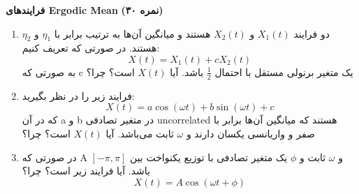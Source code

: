 \Large \textbf{فرایندهای Ergodic Mean}
\large \textbf{(۳۰ نمره)}

\normalsize \vspace{0.5cm}

\begin{enumerate}[label=(\alph*)]
	\item
	دو فرایند
	${X_1}\left( t \right)$
	و
	${X_2}\left( t \right)$
	هستند و میانگین آن‌ها به ترتیب برابر با
	${\eta _1}$
	و
	${\eta _2}$
	هستند. در صورتی که تعریف کنیم:
	$$
	X\left( t \right) = {X_1}\left( t \right) + c{X_2}\left( t \right)
	$$
	به صورتی که c یک متغیر برنولی مستقل با احتمال
	$\frac{1}{2}$
	باشد. آیا
	$X\left( t \right)$
	است؟ چرا؟
	\item 
	فرایند زیر را در نظر بگیرید:
	$$
	X\left( t \right) = a\cos \left( {\omega t} \right) + b\sin \left( {\omega t} \right) + c
	$$
	که در آن a و b در متغیر تصادفی uncorrelated هستند که میانگین آن‌ها برابر با صفر و واریانسی یکسان دارند و
	$\omega $
	ثابت می‌باشد. آیا
	$X\left( t \right)$
	است؟ چرا؟
	\item
	در صورتی که A و 
	$\omega $
	ثابت و
	$\phi $
	یک متغیر تصادفی با توزیع یکنواخت بین
	$\left[ { - \pi ,\pi } \right]$
	باشد. آیا فرایند زیر
	است؟ چرا؟
	$$
	X\left( t \right) = A\cos \left( {\omega t + \phi } \right)
	$$
\end{enumerate}


